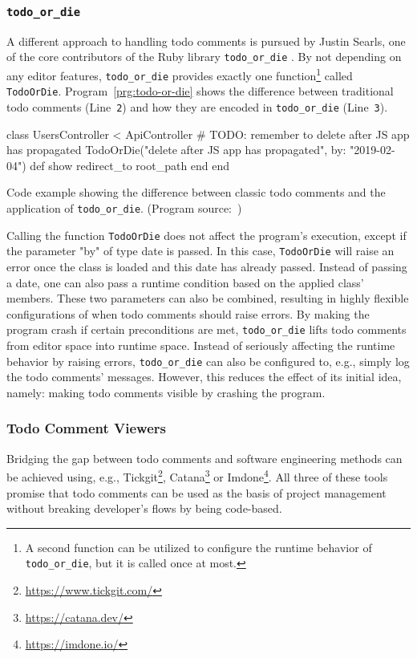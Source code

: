 \subsubsection{\texttt{todo\_or\_die}}
\label{sec:todo-or-die}
A different approach to handling todo comments is pursued by Justin Searls, one of the core contributors of the Ruby library \texttt{todo\_or\_die} \cite{searls_todo_2023}.
By not depending on any editor features, \texttt{todo\_or\_die} provides exactly one function\footnote{A second function can be utilized to configure the runtime behavior of \texttt{todo\_or\_die}, but it is called once at most.} called \texttt{TodoOrDie}.
Program~\ref{prg:todo-or-die} shows the difference between traditional todo comments (Line~\verb|2|) and how they are encoded in \texttt{todo\_or\_die} (Line~\verb|3|).
%
\begin{program}[ht]
\begin{PythonCode}
class UsersController < ApiController
  # TODO: remember to delete after JS app has propagated
  TodoOrDie("delete after JS app has propagated", by: "2019-02-04")
  def show
    redirect_to root_path
  end
end
\end{PythonCode}
\caption{Code example showing the difference between classic todo comments and the application of \texttt{todo\_or\_die}. (Program source:~\cite{searls_todo_2023})}
\label{prg:todo-or-die}
\end{program}
%
Calling the function \texttt{TodoOrDie} does not affect the program's execution, except if the parameter "by" of type date is passed.
In this case, \texttt{TodoOrDie} will raise an error once the class is loaded and this date has already passed.
Instead of passing a date, one can also pass a runtime condition based on the applied class' members.
These two parameters can also be combined, resulting in highly flexible configurations of when todo comments should raise errors.
By making the program crash if certain preconditions are met, \texttt{todo\_or\_die} lifts todo comments from editor space into runtime space.
Instead of seriously affecting the runtime behavior by raising errors, \texttt{todo\_or\_die} can also be configured to, e.g., simply log the todo comments' messages.
However, this reduces the effect of its initial idea, namely: making todo comments visible by crashing the program.


\subsubsection{Todo Comment Viewers}
Bridging the gap between todo comments and software engineering methods can be achieved using, e.g., Tickgit\footnote{\url{https://www.tickgit.com/}}, Catana\footnote{\url{https://catana.dev/}} or Imdone\footnote{\url{https://imdone.io/}}.
All three of these tools promise that todo comments can be used as the basis of project management without breaking developer's flows by being code-based.

